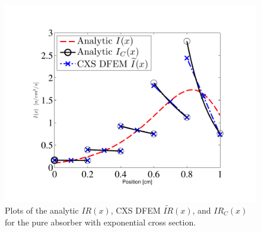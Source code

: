 \begin{figure}[!htp]
\centering
\includegraphics[width=12cm]{chapter3_variable_xs/I_Blades.pdf}
\caption{Plots of the analytic $IR(x)$, CXS DFEM $\widetilde{IR}(x)$, and  $IR_C(x)$ for the pure absorber with exponential cross section.}
\label{fig:cxs_blades_ir}
\end{figure}

